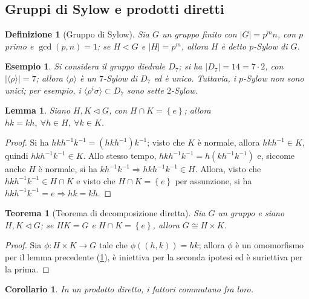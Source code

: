 \documentclass[11pt]{article}
\theoremstyle{style}
\newtheorem{esempio}{Esempio}[section]
\newtheorem{definizione}{Definizione}[section]
\newtheorem{teorema}{Teorema}[section]
\newtheorem{lemma}{Lemma}[teorema]
\newtheorem{corollario}{Corollario}[teorema]
\numberwithin{equation}{subsection}
\begin{document}
\subsection{Gruppi di Sylow e prodotti diretti}
\begin{definizione}
	[Gruppo di Sylow]
	Sia $G$ un gruppo finito con $\lvert G \rvert = p^m n$, con $p$ primo e $\operatorname{gcd}(p,n) =1$; se $H < G$ e $\lvert H \rvert = p^m$, allora $H$ \`e detto $p$-Sylow di $G$.
\end{definizione}
\begin{esempio}
Si considera il gruppo diedrale $D_7$; si ha $\lvert D_7 \rvert = 14 = 7 \cdot 2$, con $\lvert \langle \rho  \rangle \rvert = 7$; allora $\langle \rho  \rangle$ \`e un $7$-Sylow di $D_7$ ed \`e unico.
Tuttavia, i $p$-Sylow non sono unici; per esempio, i $\langle \rho ^i \sigma \rangle\subset D_7$ sono sette $2$-Sylow.
\end{esempio}
\begin{lemma}\label{lemprec161}
	Siano $H,K\lhd G$, con $H \cap K = \left\{ e \right\} $; allora $hk = kh, \ \forall h\in H, \ \forall k \in K$.
\end{lemma}
	\begin{proof}
		Si ha $hkh^{-1}k^{-1}= (hkh^{-1})k^{-1}$; visto che $K$ \`e normale, allora $hkh^{-1}\in K$, quindi $hkh^{-1}k^{-1}\in K$.
		Allo stesso tempo, $hkh^{-1}k^{-1}= h(kh^{-1}k^{-1})$ e, siccome anche $H$ \`e normale, si ha $kh^{-1}k^{-1}\Rightarrow hkh^{-1}k^{-1}\in H$.
		Allora, visto che $hkh^{-1}k^{-1}\in H\cap K$ e visto che $H\cap K = \left\{ e \right\} $ per assunzione, si ha $hkh^{-1}k^{-1}=e \Rightarrow hk=kh$.
	\end{proof}
\begin{teorema}[Teorema di decomposizione diretta]\label{t171}
	Sia $G$ un gruppo e siano $H,K \lhd G$; se $HK = G$ e $H\cap K = \left\{ e \right\} $, allora $G \cong H \times  K$.
\end{teorema}
	\begin{proof}
		Sia $\phi :H \times  K \to G$ tale che $\phi ((h,k))=hk$; allora $\phi $ \`e un omomorfismo per il lemma precedente (\ref{lemprec161}), \`e iniettiva per la seconda ipotesi ed \`e suriettiva per la prima.
	\end{proof}
\begin{corollario}
	In un prodotto diretto, i fattori commutano fra loro.
\end{corollario}	
\end{document}
